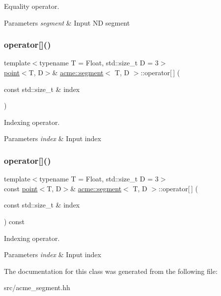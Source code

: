 Equality operator. 


\begin{DoxyParams}{Parameters}
{\em segment} & Input ND segment \\
\hline
\end{DoxyParams}
\mbox{\label{classacme_1_1segment_a2568404daa12f87d797afb4a1b48a7a9}} 
\subsubsection{\texorpdfstring{operator[]()}{operator[]()}\hspace{0.1cm}{\footnotesize\ttfamily [1/2]}}
{\footnotesize\ttfamily template$<$typename T = Float, std\+::size\+\_\+t D = 3$>$ \\
\hyperlink{classacme_1_1point}{point}$<$T, D$>$\& \hyperlink{classacme_1_1segment}{acme\+::segment}$<$ T, D $>$\+::operator\mbox{[}$\,$\mbox{]} (\begin{DoxyParamCaption}\item[{const std\+::size\+\_\+t \&}]{index }\end{DoxyParamCaption})\hspace{0.3cm}{\ttfamily [inline]}}



Indexing operator. 


\begin{DoxyParams}{Parameters}
{\em index} & Input index \\
\hline
\end{DoxyParams}
\mbox{\label{classacme_1_1segment_afae74662ff8f8349b09b13b514aeb071}} 
\subsubsection{\texorpdfstring{operator[]()}{operator[]()}\hspace{0.1cm}{\footnotesize\ttfamily [2/2]}}
{\footnotesize\ttfamily template$<$typename T = Float, std\+::size\+\_\+t D = 3$>$ \\
const \hyperlink{classacme_1_1point}{point}$<$T, D$>$\& \hyperlink{classacme_1_1segment}{acme\+::segment}$<$ T, D $>$\+::operator\mbox{[}$\,$\mbox{]} (\begin{DoxyParamCaption}\item[{const std\+::size\+\_\+t \&}]{index }\end{DoxyParamCaption}) const\hspace{0.3cm}{\ttfamily [inline]}}



Indexing operator. 


\begin{DoxyParams}{Parameters}
{\em index} & Input index \\
\hline
\end{DoxyParams}


The documentation for this class was generated from the following file\+:\begin{DoxyCompactItemize}
\item 
src/acme\+\_\+segment.\+hh\end{DoxyCompactItemize}
